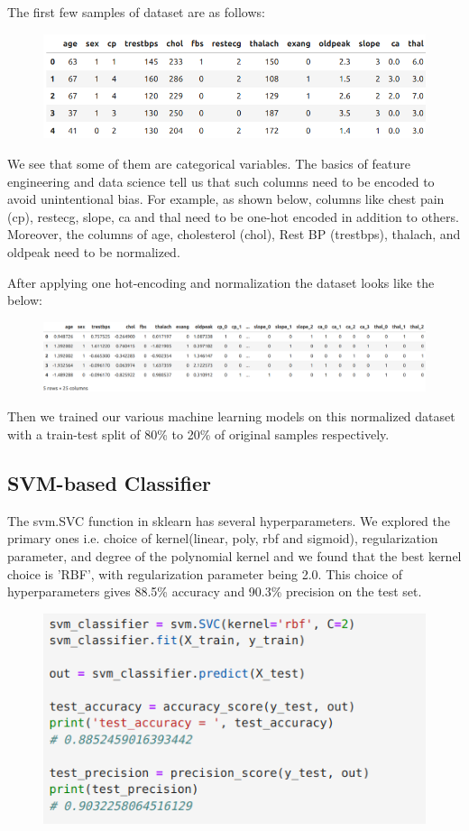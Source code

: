 \documentclass{article}
\begin{document}
\noindent The first few samples of dataset are as follows:
\begin{figure}[h]
    \centering
    \includegraphics[width=0.75\linewidth]{before.png}
\end{figure}

\noindent We see that some of them are categorical variables. The basics of feature engineering and data science tell us that such columns need to be encoded to avoid unintentional bias. For example, as shown below, columns like chest pain (cp), restecg, slope, ca and thal need to be one-hot encoded in addition to others. Moreover, the columns of age, cholesterol (chol), Rest BP (trestbps), thalach, and oldpeak need to be normalized.

After applying one hot-encoding and normalization the dataset looks like the below:
\begin{figure}[h]
\centering
    \includegraphics[width=\linewidth]{after.png}
\end{figure}

\noindent Then we trained our various machine learning models on this normalized dataset with a train-test split of 80\% to 20\% of original samples respectively.

\subsection{SVM-based Classifier}
The svm.SVC function in sklearn has several hyperparameters. We explored the primary ones i.e. choice of kernel(linear, poly, rbf and sigmoid), regularization parameter, and degree of the polynomial kernel and we found that the best kernel choice is 'RBF', with regularization parameter being 2.0.
This choice of hyperparameters gives 88.5\% accuracy and 90.3\% precision on the test set.
\begin{figure}[h]
\centering
    \includegraphics[width=0.55\linewidth]{svm.png}
\end{figure}
\end{document}
